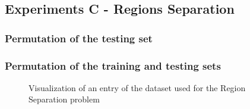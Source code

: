 \subsection{Experiments C - Regions Separation}

\subsubsection {Permutation of the testing set}

\subsubsection {Permutation of the training and testing sets}

\begin{figure}[H]
    \centering
    \caption{Visualization of an entry of the dataset used for the Region Separation problem}
    \label{fig:regions_separation_results}
\end{figure}

